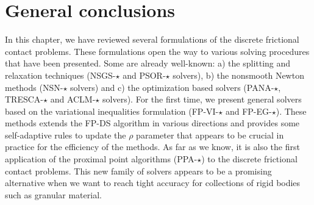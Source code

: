 


\section{General conclusions}

In this chapter, we have reviewed several formulations of the discrete frictional contact problems. These formulations open the way to various solving procedures that have been presented. Some are already well-known: a) the  splitting and relaxation techniques ({\sf NSGS-$\star$} and {\sf PSOR-$\star$} solvers), b) the nonsmooth Newton methods ({\sf NSN-$\star$} solvers) and c) the optimization based solvers ({\sf PANA-$\star$, TRESCA-$\star$ and ACLM-$\star$} solvers). For the first time, we present general solvers based on the variational inequalities formulation ({\sf FP-VI-$\star$} and {\sf FP-EG-$\star$}). These methods extends the {\sf FP-DS} algorithm in various directions and provides some self-adaptive rules to update the $\rho$ parameter that appears to be crucial in practice for the efficiency of the methods. As far as we know, it is also the first application of the proximal point algorithms ({\sf PPA-$\star$}) to the discrete frictional contact problems.  This new family of solvers appears to be a promising alternative when we want to reach tight accuracy for collections of rigid bodies such as granular material.

